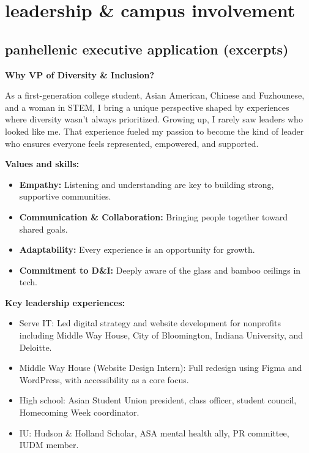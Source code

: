 \documentclass[12pt, letterpaper]{article}
\begin{document}
\section{leadership \& campus involvement}

\subsection{panhellenic executive application (excerpts)}

\textbf{Why VP of Diversity \& Inclusion?}

As a first-generation college student, Asian American, Chinese and Fuzhounese, and a woman in STEM, I bring a unique perspective shaped by experiences where diversity wasn't always prioritized. Growing up, I rarely saw leaders who looked like me. That experience fueled my passion to become the kind of leader who ensures everyone feels represented, empowered, and supported.

\textbf{Values and skills:}
\begin{itemize}
  \item \textbf{Empathy:} Listening and understanding are key to building strong, supportive communities.
  \item \textbf{Communication \& Collaboration:} Bringing people together toward shared goals.
  \item \textbf{Adaptability:} Every experience is an opportunity for growth.
  \item \textbf{Commitment to D\&I:} Deeply aware of the glass and bamboo ceilings in tech.
\end{itemize}

\textbf{Key leadership experiences:}
\begin{itemize}
  \item Serve IT: Led digital strategy and website development for nonprofits including Middle Way House, City of Bloomington, Indiana University, and Deloitte.
  \item Middle Way House (Website Design Intern): Full redesign using Figma and WordPress, with accessibility as a core focus.
  \item High school: Asian Student Union president, class officer, student council, Homecoming Week coordinator.
  \item IU: Hudson \& Holland Scholar, ASA mental health ally, PR committee, IUDM member.
\end{itemize}
\end{document}
